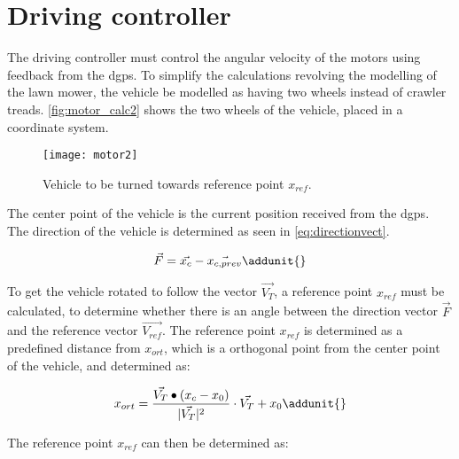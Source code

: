 \section{Driving controller}

The driving controller must control the angular velocity of the motors using feedback from the \gls{dgps}. To simplify the calculations revolving the modelling of the lawn mower, the vehicle be modelled as having two wheels instead of crawler treads.
\autoref{fig:motor_calc2} shows the two wheels of the vehicle, placed in a coordinate system.

\begin{figure}[h]
\centering
\texttt{[image: motor2]}
\caption{Vehicle to be turned towards reference point $x_{ref}$.}
\label{fig:motor_calc2}
\end{figure}

The center point of the vehicle is the current position received from the \gls{dgps}. The direction of the vehicle is determined as seen in \autoref{eq:directionvect}.

\begin{equation}
\vec{F} = \vec{x_c} - \vec{x_{c,prev}}  \addunit{}
\end{equation}
\startexplain
	\label{eq:directionvect}
\stopexplain

To get the vehicle rotated to follow the vector $\vec{V_T}$, a reference point $x_{ref}$ must be calculated, to determine whether there is an angle between the direction vector $\vec{F}$ and the reference vector $\vec{V_{ref}}$.
The reference point $x_{ref}$ is determined as a predefined distance from $x_{ort}$, which is a orthogonal point from the center point of the vehicle, and determined as:

\begin{equation}
x_{ort} = \frac{\vec{V_T}\bullet (x_c - x_0)}{|\vec{V_T}|^2} \cdot \vec{V_T} + x_0 \addunit{}
\end{equation}
\startexplain
\stopexplain
 
The reference point $x_{ref}$ can then be determined as:

